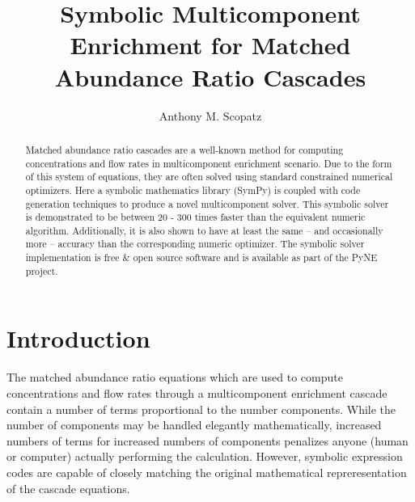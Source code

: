 \documentclass[preprint,12pt]{elsarticle}
\begin{document}
\begin{frontmatter}
\title{Symbolic Multicomponent Enrichment for Matched Abundance Ratio Cascades}

\author[chi]{Anthony M. Scopatz}

\address[chi]{The University of Chicago, The FLASH Center, 
              5754 S. Ellis Ave, Chicago, IL, 60637}

\begin{abstract}
Matched abundance ratio cascades are a well-known method for computing concentrations
and flow rates in multicomponent enrichment scenario.  Due to the form of this system 
of equations, they are often solved using standard constrained numerical 
optimizers.  Here a symbolic mathematics library (SymPy) is coupled with 
code generation techniques to produce a novel multicomponent solver.  This symbolic 
solver is demonstrated to be between 20 - 300 times faster than the equivalent 
numeric algorithm.
Additionally, it is also shown to have at least the same -- and 
occasionally more -- accuracy than the corresponding numeric optimizer.  The 
symbolic solver implementation is free \& open source software and is available as 
part of the PyNE project.
\end{abstract}

\begin{keyword}
\end{keyword}

\end{frontmatter}


%
%

\section{Introduction}
\label{sec:intro}

The matched abundance ratio equations which are used to compute concentrations and 
flow rates through a multicomponent enrichment cascade contain a number of terms 
proportional to the number components.  While the number of components may be 
handled elegantly mathematically, increased numbers of terms for increased numbers
of components penalizes anyone (human or computer) actually performing the 
calculation.  However, 
symbolic expression codes are capable of closely matching the original 
mathematical repreresentation of the cascade equations.
\end{document}
